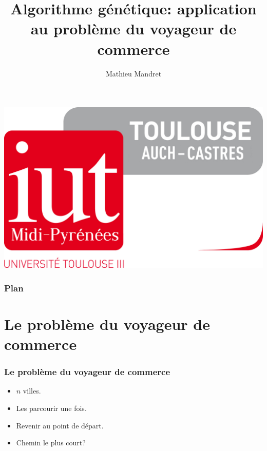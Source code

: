 \documentclass[16pt]{beamer}
\title{Algorithme génétique: application au problème du voyageur de commerce}
\author{Mathieu Mandret}
\institute{M3202 - Modélisation}
\begin{document}
\begin{frame}
  \centering
  \maketitle
  \includegraphics[scale=0.05]{logo_IUT.png}
\end{frame}

\begin{frame}
  \frametitle{Plan}
  \tableofcontents
\end{frame}

\section{Le problème du voyageur de commerce}
\begin{frame}
  \frametitle{Le problème du voyageur de commerce}
  \begin{itemize}
    \item $n$ villes.
    \item Les parcourir une fois.
    \item Revenir au point de départ.
    \item Chemin le plus court?
  \end{itemize}
\end{frame}
\end{document}

